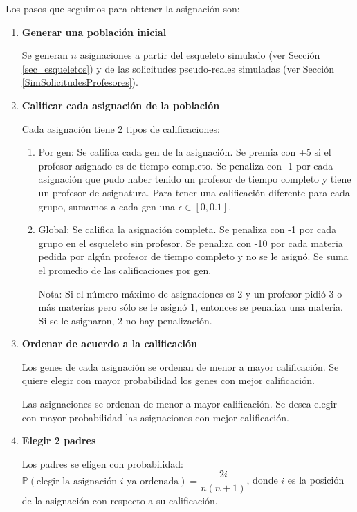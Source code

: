 Los pasos que seguimos para obtener la asignación son:

\begin{enumerate}
\item \textbf{Generar una población inicial}

Se generan $n$ asignaciones a partir del esqueleto simulado (ver Sección \ref{sec_esqueletos}) y de las solicitudes pseudo-reales simuladas (ver Sección \ref{SimSolicitudesProfesores}).

\item \textbf{Calificar cada asignación de la población}

Cada asignación tiene 2 tipos de calificaciones:

\begin{enumerate}
\item Por gen: Se califica cada gen de la asignación. Se premia con +5 si el profesor asignado es de tiempo completo. Se penaliza con -1 por cada asignación que pudo haber tenido un profesor de tiempo completo y tiene un profesor de asignatura. Para tener una calificación diferente para cada grupo, sumamos a cada gen una $\epsilon \in [0,0.1]$.

\item Global: Se califica la asignación completa. Se penaliza con -1 por cada grupo en el esqueleto sin profesor. Se penaliza con -10 por cada materia pedida por algún profesor de tiempo completo y no se le asignó. Se suma el promedio de las calificaciones por gen.

Nota:
Si el número máximo de asignaciones es 2 y un profesor pidió 3 o más  materias pero sólo se le asignó 1, entonces se penaliza una materia. Si se le asignaron, 2 no hay penalización.
\end{enumerate}

\item \textbf{Ordenar de acuerdo a la calificación}

Los genes de cada asignación se ordenan de menor a mayor calificación. Se quiere elegir con mayor probabilidad los genes con mejor calificación.

Las asignaciones se ordenan de menor a mayor calificación. Se desea elegir con mayor probabilidad las asignaciones con mejor calificación.

\item \textbf{Elegir 2 padres}

Los padres se eligen con probabilidad: $\mathbb{P}(\text{elegir la asignación } i \text{ ya ordenada}) = \dfrac{2i}{n(n+1)}$, donde $i$ es la posición de la asignación con respecto a su calificación.


\end{enumerate}
